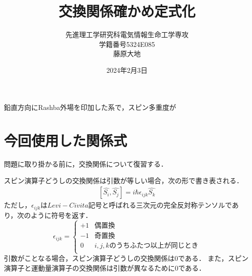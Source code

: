 \documentclass{article}
\title{交換関係確かめ定式化}
\author{先進理工学研究科電気情報生命工学専攻\\学籍番号5324E085 \\藤原大地\\}
\date{2024年2月3日}
\begin{document}
\maketitle

鉛直方向にRashba外場を印加した系で，スピン多重度が

\section{今回使用した関係式}
問題に取り掛かる前に，交換関係について復習する．

スピン演算子どうしの交換関係は引数が等しい場合，次の形で書き表される．
\begin{equation}
\begin{split}
\label{}
[\hat{S_i},\hat{S_j}]=i\hbar \epsilon_{ijk} \hat{S_k}
\end{split}
\end{equation}
ただし，$\epsilon_{ijk}$は$Levi-Civita記号$と呼ばれる三次元の完全反対称テンソルであり，次のように符号を返す．
\begin{equation}  \label{eq: cases f}
    \epsilon_{ijk}=
        \begin{cases}
            +1   &   偶置換  \\
            -1        &  奇置換    \\
            0        &   i,j,kのうちふたつ以上が同じとき    \\
        \end{cases}
    \end{equation}
引数がことなる場合，スピン演算子どうしの交換関係は0である．
また，スピン演算子と運動量演算子の交換関係は引数が異なるために0である．
\end{document}
